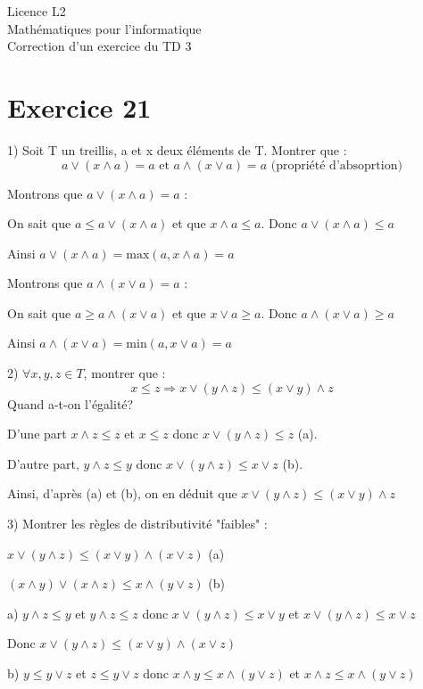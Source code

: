 \documentclass[a4paper,12pt]{article}
\begin{document}
\begin{center}
\Large{Licence L2\\Mathématiques pour l'informatique \\Correction d'un exercice du TD 3}
\end{center}

\section*{Exercice 21}

1) Soit T un treillis, a et x deux éléments de T. Montrer que :
$$ a \vee (x \wedge a) = a \text{ et } a \wedge (x \vee a) = a \text{ (propriété d'absoprtion)}$$

Montrons que $a \vee (x \wedge a) = a$ :

On sait que $a \leq a \vee (x \wedge a)$ et que $x \wedge a \leq a$. Donc $a \vee (x \wedge a) \leq a$

Ainsi $a \vee (x \wedge a) = \text{max}(a, x \wedge a) = a $

Montrons que $a \wedge (x \vee a) = a$ :

On sait que $a \geq a \wedge (x \vee a)$ et que $x \vee a \geq a$. Donc $a \wedge (x \vee a) \geq a$

Ainsi $a \wedge (x \vee a) = \text{min}(a, x \vee a) = a $

2) $\forall x, y, z \in T$, montrer que :
$$x \leq z \Rightarrow x \vee (y \wedge z) \leq (x \vee y) \wedge z$$
Quand a-t-on l'égalité?

D'une part $x \wedge z \leq z$ et $x \leq z$ donc $x \vee (y \wedge z) \leq z$ (a).

D'autre part, $y \wedge z \leq y$ donc $x \vee (y \wedge z) \leq x \vee z$ (b).

Ainsi, d'après (a) et (b), on en déduit que $x \vee (y \wedge z) \leq (x \vee y) \wedge z$

3) Montrer les règles de distributivité "faibles" :

$x \vee (y \wedge z) \leq (x \vee y) \wedge (x \vee z)$ (a)

$(x \wedge y) \vee (x \wedge z) \leq x \wedge (y \vee z)$ (b)


a) $y \wedge z \leq y$ et $y \wedge z \leq z$ donc $x \vee (y \wedge z) \leq x \vee y$ et $x \vee (y \wedge z) \leq x \vee z$

Donc $x \vee (y \wedge z) \leq (x \vee y) \wedge (x \vee z)$

b) $y \leq y \vee z$ et $z \leq y \vee z$ donc $x \wedge y \leq x \wedge (y \vee z)$ et $x \wedge z \leq x \wedge (y \vee z)$
\end{document}
